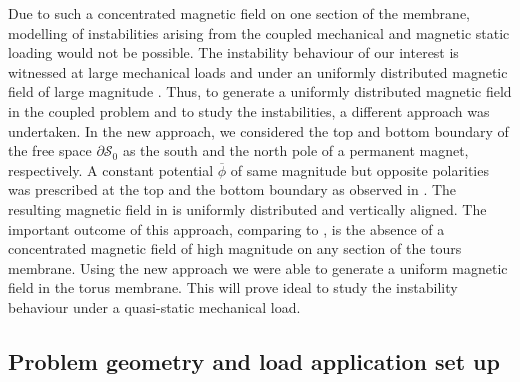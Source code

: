 \documentclass[11pt,a4paper,final]{article}
\begin{document}
Due to such a concentrated magnetic field on one section of the membrane, modelling of instabilities arising from the coupled  mechanical and magnetic static loading would not be possible. The instability behaviour of our interest is witnessed at large mechanical loads and under an uniformly distributed magnetic field of large magnitude \cite{Reddy2017,Reddy2018}. Thus, to generate a uniformly distributed magnetic field in the coupled problem and to study the instabilities, a different approach was undertaken. In the new approach, we considered the top and bottom boundary of the free space $\partial \mathcal{S}_0$ as the south and the north pole of a permanent magnet, respectively. A constant potential $\overline{\phi}$ of same magnitude but opposite polarities was prescribed at the top and the bottom boundary as observed in . The resulting magnetic field in  is uniformly distributed and vertically aligned. The important outcome of this approach, comparing  to , is the absence of a concentrated magnetic field of high magnitude on any section of the tours membrane. Using the new approach we were able to generate a uniform magnetic field in the torus membrane. This will prove ideal to study the instability behaviour under a quasi-static mechanical load. \par 

\subsection{Problem geometry and load application set up}
\label{sec:load_setup}
\end{document}
